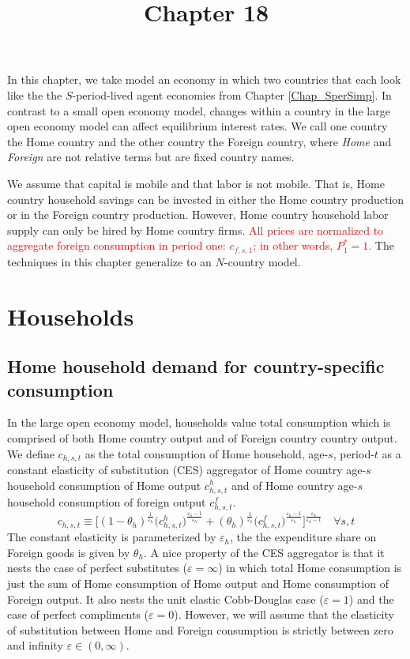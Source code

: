 \documentclass[letterpaper,12pt]{article}
\theoremstyle{definition}
\newcommand\ve{\varepsilon}
\begin{document}
\title{Chapter 18}
\maketitle

In this chapter, we take model an economy in which two countries that each look like the the $S$-period-lived agent economies from Chapter \ref{Chap_SperSimp}. In contrast to a small open economy model, changes within a country in the large open economy model can affect equilibrium interest rates. We call one country the Home country and the other country the Foreign country, where \textit{Home} and \textit{Foreign} are not relative terms but are fixed country names.

We assume that capital is mobile and that labor is not mobile. That is, Home country household savings can be invested in either the Home country production or in the Foreign country production. However, Home country household labor supply can only be hired by Home country firms. \textcolor{red}{All prices are normalized to aggregate foreign consumption in period one: $c_{f,s,1}$; in other words, $P^*_1 = 1$.} The techniques in this chapter generalize to an $N$-country model.


\section{Households}\label{SecLgOpenHH}


  \subsection{Home household demand for country-specific consumption}\label{SecLgOpenHHhomeSpec}

    In the large open economy model, households value total consumption which is comprised of both Home country output and of Foreign country country output. We define $c_{h,s,t}$ as the total consumption of Home household, age-$s$, period-$t$ as a constant elasticity of substitution (CES) aggregator of Home country age-$s$ household consumption of Home output $c^h_{h,s,t}$ and of Home country age-$s$ household consumption of foreign output $c^f_{h,s,t}$.
    \begin{equation}\label{EqLgOpenHHchCES}
      c_{h,s,t}\equiv \biggl[(1 - \theta_h)^\frac{1}{\ve_h}\bigl(c^h_{h,s,t}\bigr)^\frac{\ve_h-1}{\ve_h} + (\theta_h)^\frac{1}{\ve_h}\bigl(c^f_{h,s,t}\bigr)^\frac{\ve_h-1}{\ve_h}\biggr]^\frac{\ve_h}{\ve_h-1} \quad\forall s,t
    \end{equation}
    The constant elasticity is parameterized by $\ve_h$, the the expenditure share on Foreign goods is given by $\theta_h$. A nice property of the CES aggregator is that it nests the case of perfect substitutes ($\ve=\infty$) in which total Home consumption is just the sum of Home consumption of Home output and Home consumption of Foreign output. It also nests the unit elastic Cobb-Douglas case ($\ve=1$) and the case of perfect compliments ($\ve=0$). However, we will assume that the elasticity of substitution between Home and Foreign consumption is strictly between zero and infinity $\ve\in(0,\infty)$.
\end{document}
